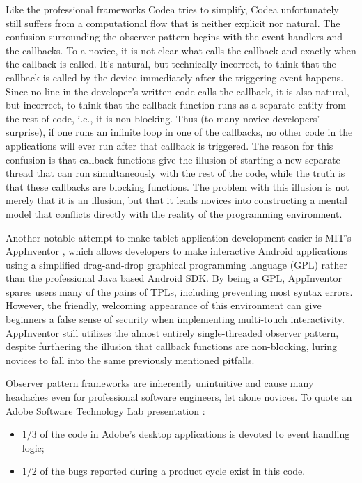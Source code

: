 Like the professional frameworks Codea tries to simplify, Codea unfortunately still suffers from a computational flow that is neither explicit nor natural. The confusion surrounding the observer pattern begins with the event handlers and the callbacks. To a novice, it is not clear what calls the callback and exactly when the callback is called. It's natural, but technically incorrect, to think that the callback is called by the device immediately after the triggering event happens. Since no line in the developer's written code calls the callback, it is also natural, but incorrect, to think that the callback function runs as a separate entity from the rest of code, i.e., it is non-blocking. Thus (to many novice developers' surprise), if one runs an infinite loop in one of the callbacks, no other code in the applications will ever run after that callback is triggered. The reason for this confusion is that callback functions give the illusion of starting a new separate thread that can run simultaneously with the rest of the code, while the truth is that these callbacks are blocking functions. The problem with this illusion is not merely that it is an illusion, but that it leads novices into constructing a mental model that conflicts directly with the reality of the programming environment. 

Another notable attempt to make tablet application development easier is MIT's AppInventor \cite{AppInventor}, which allows developers to make interactive Android applications using a simplified drag-and-drop graphical programming language (GPL) rather than the professional Java based Android SDK. By being a GPL, AppInventor spares users many of the pains of TPLs, including preventing most syntax errors. However, the friendly, welcoming appearance of this environment can give beginners a false sense of security when implementing multi-touch interactivity. AppInventor still utilizes the almost entirely single-threaded observer pattern, despite furthering the illusion that callback functions are non-blocking, luring novices to fall into the same previously mentioned pitfalls.

Observer pattern frameworks are inherently unintuitive and cause many headaches even for professional software engineers, let alone novices. To quote an Adobe Software Technology Lab presentation \cite{Parent}:

\begin{itemize}
\item $1/3$ of the code in Adobe's desktop applications is devoted to event handling logic;
\item $1/2$ of the bugs reported during a product cycle exist in this code.
\end{itemize}

